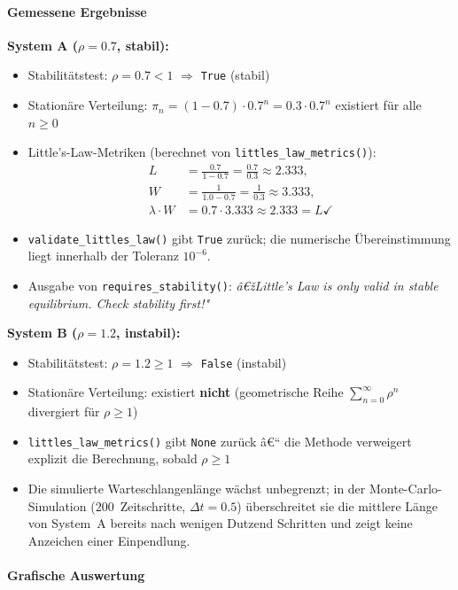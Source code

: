 ﻿\documentclass[a4paper,12pt]{scrreprt}
\theoremstyle{definition}
\begin{document}
\paragraph{Gemessene Ergebnisse}

\textbf{System A ($\rho = 0.7$, stabil):}
\begin{itemize}
	\item Stabilitätstest: $\rho = 0.7 < 1$ \quad$\Rightarrow$\quad
	\texttt{True} (stabil)
	\item Stationäre Verteilung: $\pi_n = (1-0.7)\cdot 0.7^n =
	0.3 \cdot 0.7^n$ existiert für alle $n \geq 0$
	\item Little's-Law-Metriken (berechnet von
	\texttt{littles\_law\_metrics()}):
	\begin{align*}
		L &= \frac{0.7}{1-0.7} = \frac{0.7}{0.3} \approx 2.333, \\
		W &= \frac{1}{1.0 - 0.7} = \frac{1}{0.3} \approx 3.333, \\
		\lambda \cdot W &= 0.7 \cdot 3.333 \approx 2.333 = L \checkmark
	\end{align*}
	\item \texttt{validate\_littles\_law()} gibt \texttt{True} zurück;
	die numerische Übereinstimmung liegt innerhalb der Toleranz
	$10^{-6}$.
	\item Ausgabe von \texttt{requires\_stability()}: \emph{â€žLittle's
		Law is only valid in stable equilibrium.  Check stability
		first!"}
\end{itemize}

\textbf{System B ($\rho = 1.2$, instabil):}
\begin{itemize}
	\item Stabilitätstest: $\rho = 1.2 \geq 1$ \quad$\Rightarrow$\quad
	\texttt{False} (instabil)
	\item Stationäre Verteilung: existiert \textbf{nicht} (geometrische
	Reihe $\sum_{n=0}^\infty \rho^n$ divergiert für $\rho \geq 1$)
	\item \texttt{littles\_law\_metrics()} gibt \texttt{None} zurück â€“
	die Methode verweigert explizit die Berechnung, sobald
	$\rho \geq 1$
	\item Die simulierte Warteschlangenlänge wächst unbegrenzt; in
	der Monte-Carlo-Simulation (200~Zeitschritte, $\Delta t = 0.5$)
	überschreitet sie die mittlere Länge von System~A bereits
	nach wenigen Dutzend Schritten und zeigt keine Anzeichen
	einer Einpendlung.
\end{itemize}

\paragraph{Grafische Auswertung}
\end{document}
